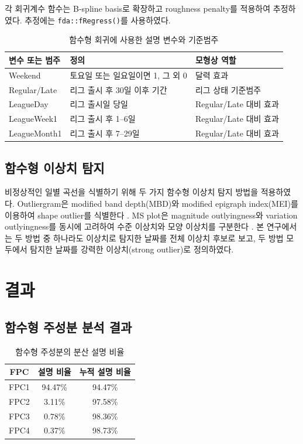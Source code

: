 \documentclass[11pt,a4paper]{article}
\begin{document}
각 회귀계수 함수는 B-spline basis로 확장하고 roughness penalty를 적용하여 추정하였다. 추정에는 \texttt{fda::fRegress()}를 사용하였다.

\begin{table}[H]
\centering
\caption{함수형 회귀에 사용한 설명 변수와 기준범주}
\begin{tabular}{lll}
\toprule
변수 또는 범주 & 정의 & 모형상 역할 \\
\midrule
Weekend & 토요일 또는 일요일이면 1, 그 외 0 & 달력 효과 \\
Regular/Late & 리그 출시 후 30일 이후 기간 & 리그 상태 기준범주 \\
LeagueDay & 리그 출시일 당일 & Regular/Late 대비 효과 \\
LeagueWeek1 & 리그 출시 후 1--6일 & Regular/Late 대비 효과 \\
LeagueMonth1 & 리그 출시 후 7--29일 & Regular/Late 대비 효과 \\
\bottomrule
\end{tabular}
\end{table}


\subsection{함수형 이상치 탐지}
비정상적인 일별 곡선을 식별하기 위해 두 가지 함수형 이상치 탐지 방법을 적용하였다. Outliergram은 modified band depth(MBD)와 modified epigraph index(MEI)를 이용하여 shape outlier를 식별한다 \citep{arribas2014outliergram}. MS plot은 magnitude outlyingness와 variation outlyingness를 동시에 고려하여 수준 이상치와 모양 이상치를 구분한다 \citep{dai2018msplot}. 본 연구에서는 두 방법 중 하나라도 이상치로 탐지한 날짜를 전체 이상치 후보로 보고, 두 방법 모두에서 탐지한 날짜를 강력한 이상치(strong outlier)로 정의하였다.

\section{결과}

\subsection{함수형 주성분 분석 결과}

\begin{table}[H]
\centering
\caption{함수형 주성분의 분산 설명 비율}
\begin{tabular}{ccc}
\toprule
FPC & 설명 비율 & 누적 설명 비율 \\
\midrule
FPC1 & 94.47\% & 94.47\% \\
FPC2 & 3.11\% & 97.58\% \\
FPC3 & 0.78\% & 98.36\% \\
FPC4 & 0.37\% & 98.73\% \\
\bottomrule
\end{tabular}
\label{tab:fpca_var}
\end{table}
\end{document}
